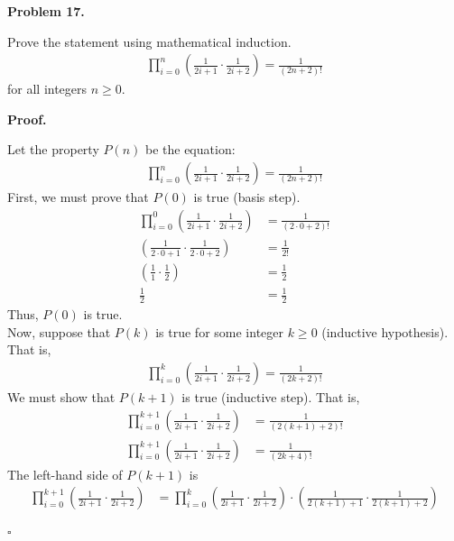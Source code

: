 \documentclass{article}
\newenvironment{problem}[1]{
    \begin{mdframed}[backgroundcolor=gray!20, skipabove=\baselineskip, skipbelow=\baselineskip, nobreak=true, innerleftmargin=10pt, innerrightmargin=10pt, innertopmargin=10pt, innerbottommargin=10pt]
    \textbf{Problem #1.}
}{
    \end{mdframed}
}
\newenvironment{proof}{
    \begin{mdframed}[nobreak=false, innerleftmargin=10pt, innerrightmargin=10pt, innertopmargin=10pt, innerbottommargin=10pt]
    \textbf{Proof.}
}{
    \hfill $\square$
    \end{mdframed}
}
\begin{document}
    \begin{problem}{17}
        Prove the statement using mathematical induction.
        \begin{align*}
            \prod_{i=0}^{n} \left(\frac{1}{2i+1} \cdot \frac{1}{2i+2} \right) = \frac{1}{(2n+2)!}
        \end{align*}
        for all integers $n \geq 0$.
    \end{problem}
    \begin{proof}
        Let the property $P(n)$ be the equation:
        \begin{align*}
            \prod_{i=0}^{n} \left(\frac{1}{2i+1} \cdot \frac{1}{2i+2} \right) = \frac{1}{(2n+2)!}
        \end{align*}
        First, we must prove that $P(0)$ is true (basis step). \\
        \begin{align*}
            \prod_{i=0}^{0} \left(\frac{1}{2i+1} \cdot \frac{1}{2i+2} \right) &= \frac{1}{(2 \cdot 0+2)!} \\
            \left(\frac{1}{2 \cdot 0+1} \cdot \frac{1}{2 \cdot 0+2} \right) &= \frac{1}{2!} \\
            \left(\frac{1}{1} \cdot \frac{1}{2} \right) &= \frac{1}{2} \\
            \frac{1}{2} &= \frac{1}{2}
        \end{align*}
        Thus, $P(0)$ is true. \\
        Now, suppose that $P(k)$ is true for some integer $k \geq 0$ (inductive hypothesis). That is,
        \begin{align*}
            \prod_{i=0}^{k} \left(\frac{1}{2i+1} \cdot \frac{1}{2i+2} \right) = \frac{1}{(2k+2)!}
        \end{align*}
        We must show that $P(k+1)$ is true (inductive step). That is,
        \begin{align*}
            \prod_{i=0}^{k+1} \left(\frac{1}{2i+1} \cdot \frac{1}{2i+2} \right) &= \frac{1}{(2(k+1)+2)!} \\
            \prod_{i=0}^{k+1} \left(\frac{1}{2i+1} \cdot \frac{1}{2i+2} \right) &= \frac{1}{(2k+4)!}
        \end{align*}
        The left-hand side of $P(k+1)$ is
        \begin{align*}
            \prod_{i=0}^{k+1} \left(\frac{1}{2i+1} \cdot \frac{1}{2i+2} \right) &= \prod_{i=0}^{k} \left(\frac{1}{2i+1} \cdot \frac{1}{2i+2} \right) \cdot \left(\frac{1}{2(k+1)+1} \cdot \frac{1}{2(k+1)+2} \right) \\

\end{align*}
\end{proof}
\end{document}
